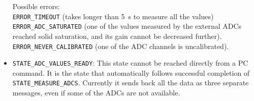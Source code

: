\documentclass[11pt,a4paper,english]{article}
\begin{document}
\begin{itemize}
	Possible errors:\\\texttt{ERROR\_TIMEOUT} (takes longer than 5~s to measure all the values)\\\texttt{ERROR\_ADC\_SATURATED} (one of the values measured by the external ADCs reached solid saturation, and its gain cannot be decreased further). \\\texttt{ERROR\_NEVER\_CALIBRATED} (one of the ADC channels is uncalibrated).

\item \texttt{STATE\_ADC\_VALUES\_READY}: This state cannot be reached directly from a PC command. It is the state that automatically follows successful completion of \texttt{STATE\_MEASURE\_ADCS}. Currently it sends back all the data as three separate messages, even if some of the ADCs are not available.




\end{itemize}
\end{document}
